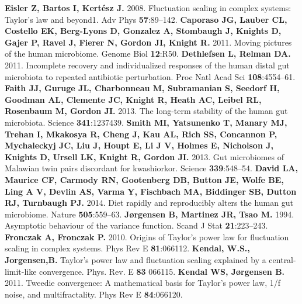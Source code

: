 \documentclass[12pt,oneside,letterpaper]{article}
\begin{document}
\begin{thebibliography}{99}
 {\bf Eisler Z, Bartos I, Kertész J.} 2008. Fluctuation scaling in complex systems: Taylor’s law and beyond1. Adv Phys {\bf 57}:89–142.
 {\bf Caporaso JG, Lauber CL, Costello EK, Berg-Lyons D, Gonzalez A, Stombaugh J, Knights D, Gajer P, Ravel J, Fierer N, Gordon JI, Knight R.} 2011. Moving pictures of the human microbiome. Genome Biol {\bf 12}:R50.
 {\bf Dethlefsen L, Relman DA.} 2011. Incomplete recovery and individualized responses of the human distal gut microbiota to repeated antibiotic perturbation. Proc Natl Acad Sci {\bf108}:4554–61.
 {\bf Faith JJ, Guruge JL, Charbonneau M, Subramanian S, Seedorf H, Goodman AL, Clemente JC, Knight R, Heath AC, Leibel RL, Rosenbaum M, Gordon JI.} 2013. The long-term stability of the human gut microbiota. Science {\bf 341}:1237439.
 {\bf Smith MI, Yatsunenko T, Manary MJ, Trehan I, Mkakosya R, Cheng J, Kau AL, Rich SS, Concannon P, Mychaleckyj JC, Liu J, Houpt E, Li J V, Holmes E, Nicholson J, Knights D, Ursell LK, Knight R, Gordon JI.} 2013. Gut microbiomes of Malawian twin pairs discordant for kwashiorkor. Science {\bf 339}:548–54.
 {\bf David LA, Maurice CF, Carmody RN, Gootenberg DB, Button JE, Wolfe BE, Ling A V, Devlin AS, Varma Y, Fischbach MA, Biddinger SB, Dutton RJ, Turnbaugh PJ.} 2014. Diet rapidly and reproducibly alters the human gut microbiome. Nature {\bf 505}:559–63.
 {\bf Jørgensen B, Martinez JR, Tsao M.} 1994. Asymptotic behaviour of the variance function. Scand J Stat {\bf 21}:223–243.
 {\bf Fronczak A, Fronczak P.} 2010. Origins of Taylor’s power law for fluctuation scaling in complex systems. Phys Rev E {\bf 81}:066112.
 {\bf Kendal, W.S., Jorgensen,B.} Taylor's power law and fluctuation scaling explained by a central-limit-like convergence.  Phys. Rev. E {\bf 83} 066115.
 {\bf Kendal WS, Jørgensen B.} 2011. Tweedie convergence: A mathematical basis for Taylor’s power law, 1/f noise, and multifractality. Phys Rev E {\bf 84}:066120.


\end{thebibliography}
\end{document}
